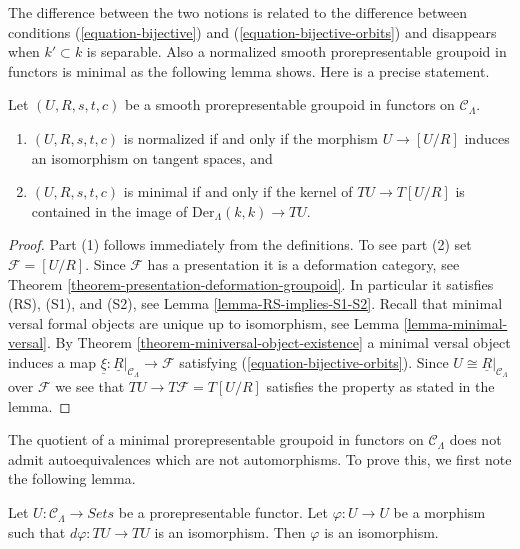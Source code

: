 \noindent
The difference between the two notions is related to the difference between
conditions (\ref{equation-bijective}) and (\ref{equation-bijective-orbits})
and disappears when $k' \subset k$ is separable. Also a
normalized smooth prorepresentable groupoid in functors is minimal
as the following lemma shows. Here is a precise statement.

\begin{lemma}
\label{lemma-characterize-minimal-groupoid-in-functors}
Let $(U, R, s, t, c)$ be a smooth prorepresentable groupoid in
functors on $\mathcal{C}_\Lambda$.
\begin{enumerate}
\item $(U, R, s, t, c)$ is normalized if and only if the morphism
$U \to [U/R]$ induces an isomorphism on tangent spaces, and
\item $(U, R, s, t, c)$ is minimal if and only if the kernel of
$TU \to T[U/R]$ is contained in the image of
$\text{Der}_\Lambda(k, k) \to TU$.
\end{enumerate}
\end{lemma}

\begin{proof}
Part (1) follows immediately from the definitions.
To see part (2) set $\mathcal{F} = [U/R]$. Since $\mathcal{F}$
has a presentation it is a deformation category, see
Theorem \ref{theorem-presentation-deformation-groupoid}.
In particular it satisfies (RS), (S1), and (S2), see
Lemma \ref{lemma-RS-implies-S1-S2}.
Recall that minimal versal formal objects are unique up to isomorphism, see
Lemma \ref{lemma-minimal-versal}.
By
Theorem \ref{theorem-miniversal-object-existence}
a minimal versal object induces a map
$\underline{\xi} : \underline{R}|_{\mathcal{C}_\Lambda} \to \mathcal{F}$
satisfying (\ref{equation-bijective-orbits}). Since
$U \cong \underline{R}|_{\mathcal{C}_\Lambda}$ over $\mathcal{F}$
we see that $TU \to T\mathcal{F} = T[U/R]$ satisfies the property
as stated in the lemma.
\end{proof}

\noindent
The quotient of a minimal prorepresentable groupoid in functors on $\mathcal
C_\Lambda$ does not admit autoequivalences which are not automorphisms.  To
prove this, we first note the following lemma.

\begin{lemma}
\label{lemma-surjective-morphism-prorepresentable-functor}
Let $U: \mathcal{C}_\Lambda \to \textit{Sets}$ be a
prorepresentable functor. Let $\varphi : U \to U$ be a morphism such
that $d\varphi : TU \to TU$ is an isomorphism.  Then $\varphi$ is an
isomorphism.
\end{lemma}

